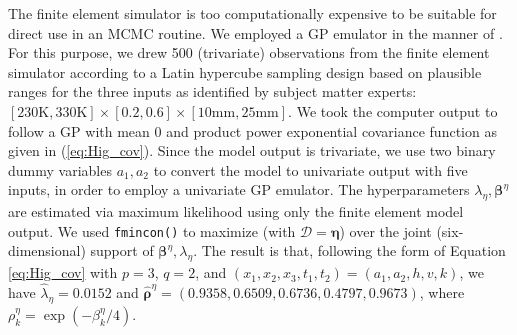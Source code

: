 \documentclass[12pt]{article}
\begin{document}
The finite element simulator is too computationally expensive to be suitable for direct use in an MCMC routine.
%
We employed a GP emulator in the manner of \cite{Williams2006}.
%
For this purpose, we drew 500 (trivariate) observations from the finite element simulator according to a Latin hypercube sampling design \citep{McKay1979} based on plausible ranges for the three inputs as identified by subject matter experts: $[230\mathrm{K}, 330\mathrm{K}] \times [0.2,0.6]\times[10\mathrm{mm},25\mathrm{mm}]$.
%
We took the computer output to follow a GP with mean 0 and product power exponential covariance function as given in (\ref{eq:Hig_cov}).
%
Since the model output is trivariate, we use two binary dummy variables $a_1,a_2$ to convert the model to univariate output with five inputs, in order to employ a univariate GP emulator.
%
The hyperparameters $\lambda_\eta,\boldsymbol \beta^\eta$ are estimated %
%
via maximum likelihood using only the finite element model output.
%
%
We used \texttt{fmincon()} \citep{MATLAB2017} %
to maximize (with $\mathcal D=\boldsymbol\eta$) over the joint (six-dimensional) support of $\boldsymbol \beta^\eta,\lambda_\eta$.
%
The result is that, following the form of Equation \eqref{eq:Hig_cov} with $p=3$, $q=2$, and $(x_1,x_2,x_3,t_1,t_2)=(a_1,a_2,h,v,k)$, we have $\hat\lambda_\eta = 0.0152$ and $\boldsymbol {\hat\rho}^\eta = (0.9358, 0.6509, 0.6736, 0.4797, 0.9673)$,
where $\rho^\eta_k = \exp(-\beta_k^\eta/4)$.
%
\end{document}

